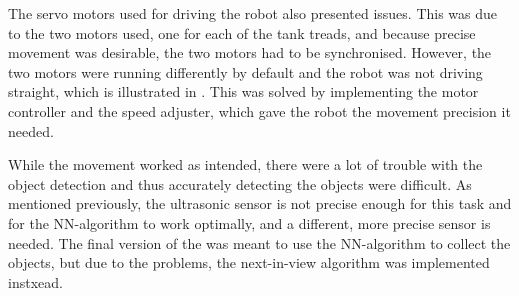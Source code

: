 The servo motors used for driving the robot also presented issues. This was due to the two motors used, one for each of the tank treads, and because precise movement was desirable, the two motors had to be synchronised. However, the two motors were running differently by default and the robot was not driving straight, which is illustrated in . This was solved by implementing the motor controller and the speed adjuster, which gave the robot the movement precision it needed.

While the movement worked as intended, there were a lot of trouble with the object detection and thus accurately detecting the objects were difficult. As mentioned previously, the ultrasonic sensor is not precise enough for this task and for the NN-algorithm to work optimally, and a different, more precise sensor is needed. The final version of the \projname{} was meant to use the NN-algorithm to collect the objects, but due to the problems, the next-in-view algorithm was implemented instxead.




